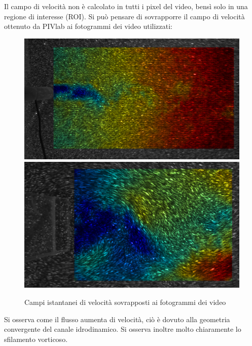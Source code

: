 \noindent Il campo di velocità non è calcolato in tutti i pixel del video, bensì solo in una regione di interesse (ROI). Si può pensare di sovrapporre il campo di velocità ottenuto da PIVlab ai fotogrammi dei video utilizzati:
\begin{figure}[H]
    \centering
    \includegraphics[width=\textwidth]{images/11/overlapped.png}
    \includegraphics[width=\textwidth]{images/11/overlap_220.png}
    \caption{Campi istantanei di velocità sovrapposti ai fotogrammi dei video}
\end{figure}

\noindent Si osserva come il flusso aumenta di velocità, ciò è dovuto alla geometria convergente del canale idrodinamico. Si osserva inoltre molto chiaramente lo sfilamento vorticoso.

